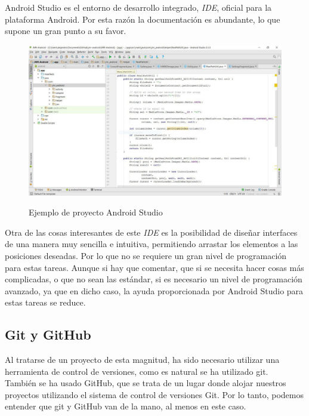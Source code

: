 Android Studio es el entorno de desarrollo integrado, \textit{IDE}, oficial para la plataforma Android. Por esta razón la documentación es abundante, lo que supone un gran punto a su favor.\\

\begin{figure}[H] %
\centering
\includegraphics[scale=0.5]{imagenes/android-studio.jpg}  %
\label{android-studio.jpg}
\caption{Ejemplo de proyecto Android Studio}
\end{figure}

Otra de las cosas interesantes de este \textit{IDE} es la posibilidad de diseñar interfaces de una manera muy sencilla e intuitiva, permitiendo arrastar los elementos a las posiciones deseadas. Por lo que no se requiere un gran nivel de programación para estas tareas. Aunque si hay que comentar, que si se necesita hacer cosas más complicadas, o que no sean las estándar, si es necesario un nivel de programación avanzado, ya que en dicho caso, la ayuda proporcionada por Android Studio para estas tareas se reduce.\\ 

\subsection{Git y GitHub}

Al tratarse de un proyecto de esta magnitud, ha sido necesario utilizar una herramienta de control de versiones, como es natural se ha utilizado git.\\

También se ha usado GitHub, que se trata de un lugar donde alojar nuestros proyectos utilizando el sistema de control de versiones Git. Por lo tanto, podemos entender que git y GitHub van de la mano, al menos en este caso.\\

